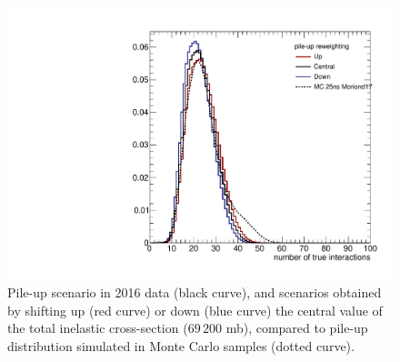 \begin{figure}[!htb]
  \begin{center}
    \includegraphics[width=.495\textwidth]{figures/PU_Moriond17.pdf}
  \end{center}
  \caption{Pile-up scenario in 2016 data (black curve), and scenarios obtained by shifting up (red curve) or down (blue curve) the central value of the total inelastic cross-section ($69\,200$ mb), compared to pile-up distribution simulated in Monte Carlo samples (dotted curve).}
  \label{fig:PU_updown}
\end{figure}

